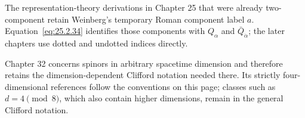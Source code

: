 The representation-theory derivations in Chapter 25 that were already
two-component retain Weinberg's temporary Roman component label \(a\).
Equation~\eqref{eq:25.2.34} identifies those components with
\(Q_\alpha\) and \(\bar Q_{\dot\alpha}\); the later chapters use dotted and
undotted indices directly.

Chapter 32 concerns spinors in arbitrary spacetime dimension and therefore
retains the dimension-dependent Clifford notation needed there.  Its
strictly four-dimensional references follow the conventions on this page;
classes such as \(d=4\pmod 8\), which also contain higher dimensions, remain
in the general Clifford notation.

